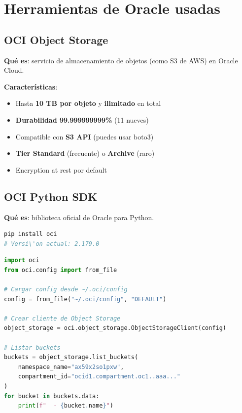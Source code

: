 \documentclass[11pt,a4paper,oneside]{article}
\newcommand{\ok}{\textcolor{okgreen}{\textbf{\checkmark}}}
\begin{document}
\section{Herramientas de Oracle usadas}

\subsection{OCI Object Storage}

\textbf{Qu\'e es}: servicio de almacenamiento de objetos (como S3 de AWS) en Oracle Cloud.

\textbf{Caracter\'isticas}:
\begin{itemize}
  \item \ok Hasta \textbf{10 TB por objeto} y \textbf{ilimitado} en total
  \item \ok \textbf{Durabilidad 99.999999999\%} (11 nueves)
  \item \ok Compatible con \textbf{S3 API} (puedes usar boto3)
  \item \ok \textbf{Tier Standard} (frecuente) o \textbf{Archive} (raro)
  \item \ok Encryption at rest por default
\end{itemize}

\subsection{OCI Python SDK}

\textbf{Qu\'e es}: biblioteca oficial de Oracle para Python.

\begin{lstlisting}[language=bash,caption={Instalaci\'on}]
pip install oci
# Versi\'on actual: 2.179.0
\end{lstlisting}

\begin{lstlisting}[language=Python,caption={Uso b\'asico}]
import oci
from oci.config import from_file

# Cargar config desde ~/.oci/config
config = from_file("~/.oci/config", "DEFAULT")

# Crear cliente de Object Storage
object_storage = oci.object_storage.ObjectStorageClient(config)

# Listar buckets
buckets = object_storage.list_buckets(
    namespace_name="ax59x2so1pxw",
    compartment_id="ocid1.compartment.oc1..aaa..."
)
for bucket in buckets.data:
    print(f"  - {bucket.name}")
\end{lstlisting}
\end{document}

